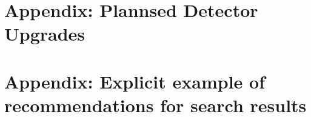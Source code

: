 \documentclass[a4paper,debug,notitlepage,nobib]{tufte-book}
\begin{document}


\appendix

%

\chapter{Appendix: Plannsed Detector Upgrades}
\label{app:Upgrade_Appendix}


\chapter{Appendix: Explicit example of recommendations for search results}
\label{app:ExampleRec_Appendix}


%
% 
%
%
%
%
%
\printbibliography
\end{document}

